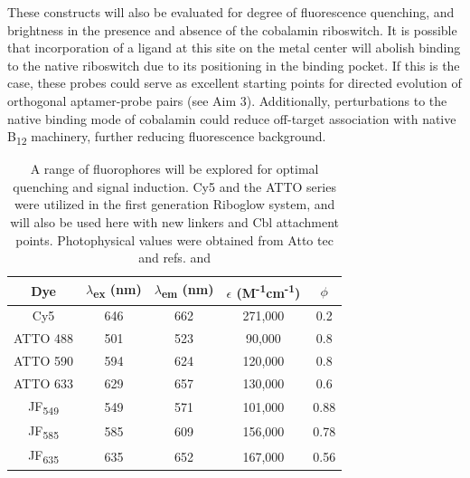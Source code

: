 These constructs will also be evaluated for degree of fluorescence quenching, and brightness in the presence and absence of the cobalamin riboswitch.
It is possible that incorporation of a ligand at this site on the metal center will abolish binding to the native riboswitch due to its positioning in the binding pocket\cite{JohnsonJrB12cofactorsdirectly2012}.
If this is the case, these probes could serve as excellent starting points for directed evolution of orthogonal aptamer-probe pairs (see Aim 3).
Additionally, perturbations to the native binding mode of cobalamin could reduce off-target association with native B\textsubscript{12} machinery\cite{PathareSynthesisCobalaminBiotin1996}, further reducing fluorescence background.

\begin{table}
\caption{A range of fluorophores will be explored for optimal quenching and signal induction. Cy5 and the ATTO series were utilized in the first generation Riboglow system, and will also be used here with new linkers and Cbl attachment points. Photophysical values were obtained from Atto tec and refs. \cite{BraselmannDevelopmentriboswitchbasedplatform2017} and \cite{Grimmgeneralmethodfinetune2017}}\label{fluorophores}
\begin{tabular}{c|cccc}
  \toprule
 Dye &  $\lambda$\textsubscript{ex} (nm) &  $\lambda$\textsubscript{em} (nm) &  $\epsilon$ (M\textsuperscript{-1}cm\textsuperscript{-1}) &  $\phi$ \\\toprule
Cy5 & 646 & 662 & 271,000 & 0.2\\
ATTO 488 & 501 & 523 & 90,000 & 0.8\\
ATTO 590 & 594 & 624 & 120,000 & 0.8\\
ATTO 633 & 629 & 657 & 130,000 & 0.6\\  \hline
JF\textsubscript{549} & 549 & 571 & 101,000 & 0.88\\
JF\textsubscript{585} & 585 & 609 & 156,000 & 0.78\\
JF\textsubscript{635} & 635 & 652 & 167,000 & 0.56\\
\bottomrule
\end{tabular}
\end{table}

